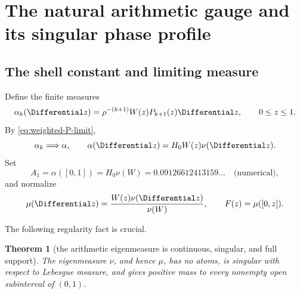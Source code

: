 \documentclass[11pt,oneside]{article}
\newtheorem{theorem}{Theorem}[section]
\theoremstyle{definition}
\theoremstyle{remark}
\begin{document}
\section{The natural arithmetic gauge and its singular phase profile}
\label{sec:natural-gauge}

\subsection{The shell constant and limiting measure}

Define the finite measures
\begin{equation}
 \alpha_k(\Differential z)
 =\rho^{-(k+1)}W(z)P_{k+1}(z)\Differential z,
 \qquad 0\le z\le1.
 \label{eq:alpha-k}
\end{equation}
By \eqref{eq:weighted-P-limit},
\begin{equation}
 \alpha_k\Longrightarrow\alpha,
 \qquad
 \alpha(\Differential z)=H_0W(z)\nu(\Differential z).
 \label{eq:alpha-limit}
\end{equation}
Set
\begin{equation}
 A_1=\alpha([0,1])=H_0\nu(W)
 =0.09126612413159\ldots\quad\text{(numerical)},
 \label{eq:A1}
\end{equation}
and normalize
\begin{equation}
 \mu(\Differential z)=\frac{W(z)\nu(\Differential z)}{\nu(W)},
 \qquad
 F(z)=\mu([0,z]).
 \label{eq:mu-F}
\end{equation}

The following regularity fact is crucial.

\begin{theorem}[the arithmetic eigenmeasure is continuous, singular, and full support]
\label{thm:nu-singular}
The eigenmeasure \(\nu\), and hence \(\mu\), has no atoms, is singular with
respect to Lebesgue measure, and gives positive mass to every nonempty open
subinterval of \((0,1)\).
\end{theorem}
\end{document}
